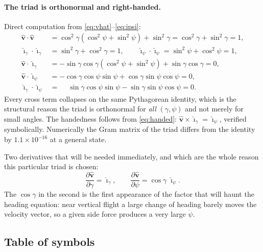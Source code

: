 \documentclass[11pt]{article}
\newcommand{\vhat}{\hat{\mathbf{v}}}
\newcommand{\ig}{\hat{\boldsymbol{\imath}}_{\gamma}}
\newcommand{\ip}{\hat{\boldsymbol{\imath}}_{\psi}}
\begin{document}
\paragraph{The triad is orthonormal and right-handed.}
Direct computation from \eqref{eq:vhat}--\eqref{eq:ipsi}:
\begin{align}
  \vhat\cdot\vhat &= \cos^2\!\gamma(\cos^2\!\psi+\sin^2\!\psi) + \sin^2\!\gamma
                   = \cos^2\!\gamma + \sin^2\!\gamma = 1, \nonumber\\
  \ig\cdot\ig   &= \sin^2\!\gamma + \cos^2\!\gamma = 1, \qquad
  \ip\cdot\ip    = \sin^2\!\psi + \cos^2\!\psi = 1, \nonumber\\
  \vhat\cdot\ig &= -\sin\gamma\cos\gamma(\cos^2\!\psi+\sin^2\!\psi)
                   + \sin\gamma\cos\gamma = 0, \nonumber\\
  \vhat\cdot\ip &= -\cos\gamma\cos\psi\sin\psi + \cos\gamma\sin\psi\cos\psi = 0,
                   \nonumber\\
  \ig\cdot\ip   &= \phantom{-}\sin\gamma\cos\psi\sin\psi
                   - \sin\gamma\sin\psi\cos\psi = 0 .
  \label{eq:orthonormal}
\end{align}
Every cross term collapses on the same Pythagorean identity, which is the
structural reason the triad is orthonormal for \emph{all} $(\gamma,\psi)$ and
not merely for small angles. The handedness follows from \eqref{eq:handed}:
$\vhat\times\ig = \ip$, verified symbolically. Numerically the Gram matrix of
the triad differs from the identity by $1.1\times10^{-16}$ at a general state.

Two derivatives that will be needed immediately, and which are the whole reason
this particular triad is chosen:
\begin{equation}
  \frac{\partial\vhat}{\partial\gamma} = \ig ,
  \qquad
  \frac{\partial\vhat}{\partial\psi} = \cos\gamma\;\ip .
  \label{eq:dvhat}
\end{equation}
The $\cos\gamma$ in the second is the first appearance of the factor that will
haunt the heading equation: near vertical flight a large change of heading
barely moves the velocity vector, so a given side force produces a very large
$\dot\psi$.

\subsection{Table of symbols}
\end{document}
